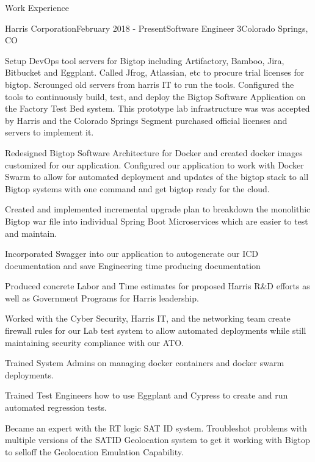 \documentclass{resume} %
\begin{document}
\begin{rSection}{Work Experience}
\begin{rSubsection}{Harris Corporation}{February 2018 - Present}{Software Engineer 3}{Colorado Springs, CO}
\item Setup DevOps tool servers for Bigtop including Artifactory, Bamboo, Jira, Bitbucket and Eggplant. Called Jfrog, Atlassian, etc to procure trial licenses for bigtop. Scrounged old servers from harris IT to run the tools. Configured the tools to continuously build, test, and deploy the Bigtop Software Application on the Factory Test Bed system. This prototype lab infrastructure was was accepted by Harris and the Colorado Springs Segment purchased official licenses and servers to implement it. 
\item Redesigned Bigtop Software Architecture for Docker and created docker images customized for our application. Configured our application to work with Docker Swarm to allow for automated deployment and updates of the bigtop stack to all Bigtop systems with one command and get bigtop ready for the cloud.  
\item Created and implemented incremental upgrade plan to breakdown the monolithic Bigtop war file into individual Spring Boot Microservices which are easier to test and maintain. 
\item Incorporated Swagger into our application to autogenerate our ICD documentation and save Engineering time producing documentation
\item Produced concrete Labor and Time estimates for proposed Harris R\&D efforts as well as Government Programs for Harris leadership. 
\item Worked with the Cyber Security, Harris IT, and the networking team create firewall rules for our Lab test system to allow automated deployments while still maintaining security compliance with our ATO. 
\item Trained System Admins on managing docker containers and docker swarm deployments. 
\item Trained Test Engineers how to use Eggplant and Cypress to create and run automated regression tests. 
\item Became an expert with the RT logic SAT ID system. Troubleshot problems with multiple versions of the SATID Geolocation system to get it working with Bigtop to selloff the Geolocation Emulation Capability. 


\end{rSubsection}
\end{rSection}
\end{document}
